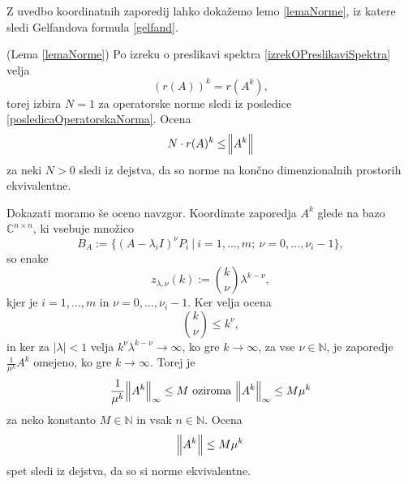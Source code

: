 \documentclass[mat1]{fmfdelo}
\newcommand{\N}{\mathbb N}
\newcommand{\C}{\mathbb C}
\begin{document}
Z uvedbo koordinatnih zaporedij lahko dokažemo lemo \ref{lemaNorme}, iz katere sledi Gelfandova formula \ref{gelfand}.
\begin{dokaz}
    (Lema \ref{lemaNorme}) Po izreku o preslikavi spektra  \ref{izrekOPreslikaviSpektra} velja
    \begin{equation}
        \left(r(A)\right)^k = r(A^k),
    \end{equation}
    torej izbira $N = 1$ za operatorske norme sledi iz posledice \ref{posledicaOperatorskaNorma}. Ocena
    \begin{equation}
        N \cdot r(A)^k \leq \norm{A^k}
    \end{equation}
    za neki $N > 0$ sledi iz dejstva, da so norme na končno dimenzionalnih prostorih ekvivalentne.

    Dokazati moramo še oceno navzgor. Koordinate zaporedja $A^k$ glede na bazo $\C^{n \times n}$, ki vsebuje množico
    \begin{equation}
        B_A := \{(A-\lambda_i I)^{\nu} P_i\ |\ i = 1, \ldots, m;\ \nu = 0, \ldots, \nu_i - 1\},
    \end{equation}
    so enake
    \begin{equation}
        z_{\lambda, \nu} (k) := {k \choose \nu} \lambda^{k - \nu},
    \end{equation}
    kjer je $i = 1, \ldots, m$ in $\nu = 0, \ldots, \nu_i-1$. Ker velja ocena
    \begin{equation}
        {k \choose \nu} \leq k^\nu,
    \end{equation}
    in ker za $|\lambda| < 1$ velja $k^\nu \lambda^{k-\nu} \rightarrow \infty$, ko gre $k\rightarrow \infty$, za vse $\nu \in \N$, je zaporedje $\frac{1}{\mu^k} A^k$ omejeno, ko gre $k\rightarrow \infty$. Torej je
    \begin{equation}
        \frac{1}{\mu^k} \norm{A^k}_\infty \leq M\ \text{oziroma}\ \norm{A^k}_\infty \leq M \mu^k
    \end{equation}
    za neko konstanto $M \in \N$ in vsak $n \in \N$. Ocena
    \begin{equation}
        \norm{A^k} \leq M \mu^k
    \end{equation}
    spet sledi iz dejstva, da so si norme ekvivalentne.
\end{dokaz}
\end{document}
